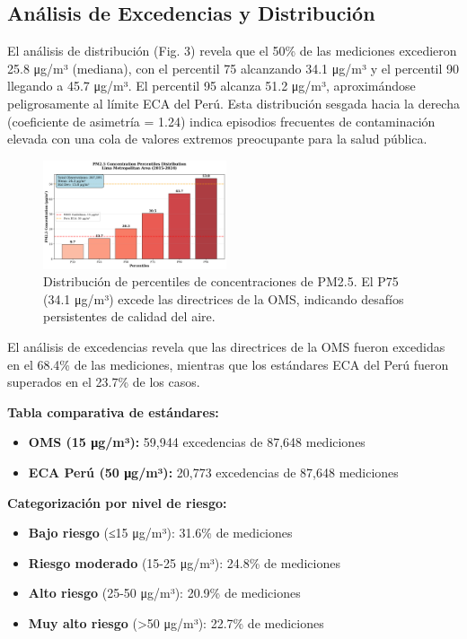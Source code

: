 \documentclass[conference]{IEEEtran}
\begin{document}
\subsection{Análisis de Excedencias y Distribución}

El análisis de distribución (Fig. 3) revela que el 50\% de las mediciones excedieron 25.8 μg/m³ (mediana), con el percentil 75 alcanzando 34.1 μg/m³ y el percentil 90 llegando a 45.7 μg/m³. El percentil 95 alcanza 51.2 μg/m³, aproximándose peligrosamente al límite ECA del Perú. Esta distribución sesgada hacia la derecha (coeficiente de asimetría = 1.24) indica episodios frecuentes de contaminación elevada con una cola de valores extremos preocupante para la salud pública.

\begin{figure}[htbp]
\centerline{\includegraphics[width=0.48\textwidth]{Figura_3_Percentiles_PM25.png}}
\caption{Distribución de percentiles de concentraciones de PM2.5. El P75 (34.1 μg/m³) excede las directrices de la OMS, indicando desafíos persistentes de calidad del aire.}
\label{fig:percentiles}
\end{figure}

El análisis de excedencias revela que las directrices de la OMS fueron excedidas en el 68.4\% de las mediciones, mientras que los estándares ECA del Perú fueron superados en el 23.7\% de los casos.

\textbf{Tabla comparativa de estándares:}
\begin{itemize}
    \item \textbf{OMS (15 μg/m³):} 59,944 excedencias de 87,648 mediciones
    \item \textbf{ECA Perú (50 μg/m³):} 20,773 excedencias de 87,648 mediciones
\end{itemize}

\textbf{Categorización por nivel de riesgo:}
\begin{itemize}
    \item \textbf{Bajo riesgo} (≤15 μg/m³): 31.6\% de mediciones
    \item \textbf{Riesgo moderado} (15-25 μg/m³): 24.8\% de mediciones  
    \item \textbf{Alto riesgo} (25-50 μg/m³): 20.9\% de mediciones
    \item \textbf{Muy alto riesgo} (>50 μg/m³): 22.7\% de mediciones
\end{itemize}
\end{document}
